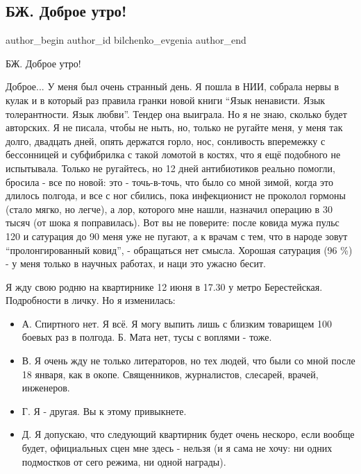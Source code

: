  
 
 
 
 
 
\subsection{БЖ. Доброе утро!}
\label{sec:08_06_2021.fb.bilchenko_evgenia.1.dobroje_utro}
\ifcmt
 author_begin
   author_id bilchenko_evgenia
 author_end
\fi

БЖ. Доброе утро!

Доброе... У меня был очень странный день. Я пошла в НИИ, собрала нервы в кулак
и в который раз правила гранки новой книги \enquote{Язык ненависти. Язык толерантности.
Язык любви}. Тендер она выиграла. Но я не знаю, сколько будет авторских. Я не
писала, чтобы не ныть, но, только не ругайте меня, у меня так долго, двадцать
дней, опять держатся горло, нос, сонливость вперемежку с бессонницей и
субфибрилка с такой ломотой в костях, что я ещё подобного не испытывала. Только
не ругайтесь, но 12 дней антибиотиков реально помогли, бросила - все по новой:
это - точь-в-точь, что было со мной зимой, когда это длилось полгода, и все с
ног сбились, пока инфекционист не проколол гормоны (стало мягко, но легче), а
лор, которого мне нашли, назначил операцию в 30 тысяч (от шока я поправилась).
Вот вы не поверите: после ковида мужа пульс 120 и сатурация до 90 меня уже не
пугают, а к врачам с тем, что в народе зовут \enquote{пролонгированный ковид}, -
обращаться нет смысла. Хорошая сатурация (96 \%) - у меня только в научных
работах, и наци это ужасно бесит.

Я жду свою родню на квартирнике 12 июня в 17.30 у метро Берестейская. Подробности в личку. Но я изменилась: 

\begin{itemize}
\item А. Спиртного нет. Я всё. Я могу выпить лишь с близким товарищем 100 боевых раз в полгода. Б. Мата нет, тусы с воплями - тоже. 
\item В. Я очень жду не только литераторов, но тех людей, что были со мной
после 18 января, как в окопе. Священников, журналистов, слесарей,
врачей, инженеров. 

\item Г. Я - другая. Вы к этому привыкнете. 
\item Д. Я допускаю, что следующий квартирник будет очень нескоро, если вообще будет, официальных сцен мне здесь - нельзя (и я сама не хочу: ни одних подмостков от сего режима, ни одной награды). 
\end{itemize}

